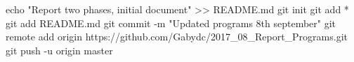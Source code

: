 echo "Report two phases, initial document" >> README.md
git init
git add *
git add README.md
git commit -m "Updated programs 8th september"
git remote add origin https://github.com/Gabydc/2017_08_Report_Programs.git
git push -u origin master
